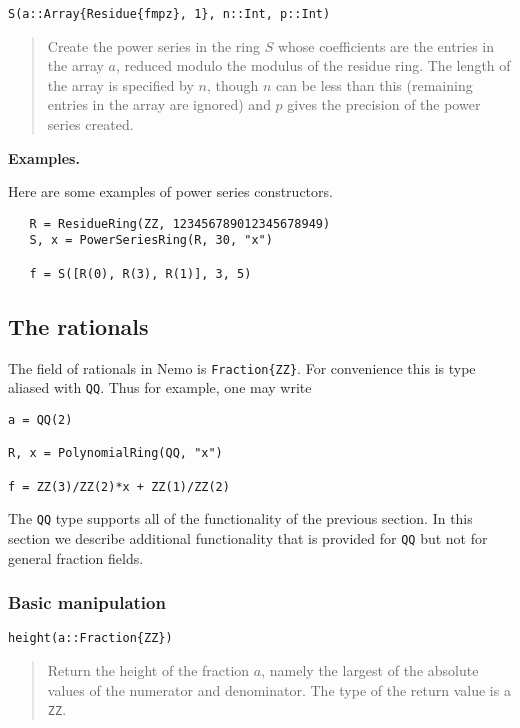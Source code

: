 \documentclass[a4paper,10pt]{article}
\newcommand{\code}{\lstinline}
\newcommand{\desc}[1]{\vspace{-3mm}\begin{quote}#1\end{quote}}
\begin{document}
{{\begin{lstlisting}
S(a::Array{Residue{fmpz}, 1}, n::Int, p::Int)
\end{lstlisting}

\desc{Create the power series in the ring $S$ whose coefficients are the entries in
the array $a$, reduced modulo the modulus of the residue ring. The length of the
array is specified by $n$, though $n$ can be less than this (remaining entries in the
array are ignored) and $p$ gives the precision of the power series created.}

\textbf{Examples.}

Here are some examples of power series constructors.

\begin{lstlisting}
   R = ResidueRing(ZZ, 123456789012345678949)
   S, x = PowerSeriesRing(R, 30, "x")

   f = S([R(0), R(3), R(1)], 3, 5)
\end{lstlisting}

\subsection{The rationals}

The field of rationals in Nemo is \code|Fraction{ZZ}|. For convenience this is
type aliased with \code{QQ}. Thus for example, one may write

\begin{lstlisting}
a = QQ(2)

R, x = PolynomialRing(QQ, "x")

f = ZZ(3)/ZZ(2)*x + ZZ(1)/ZZ(2)
\end{lstlisting}

The \code{QQ} type supports all of the functionality of the previous section. In
this section we describe additional functionality that is provided for \code{QQ}
but not for general fraction fields.

\subsubsection{Basic manipulation}

\begin{lstlisting}
height(a::Fraction{ZZ})
\end{lstlisting}

\desc{Return the height of the fraction $a$, namely the largest of the absolute
values of the numerator and denominator. The type of the return value is a 
\code{ZZ}.}

}}
\end{document}
